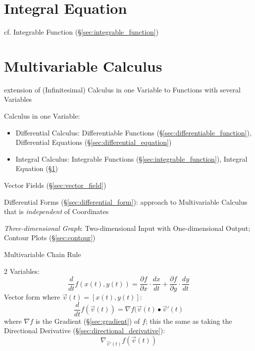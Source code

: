 \section{Integral Equation}\label{sec:integral_equation}

cf. Integrable Function (\S\ref{sec:integrable_function})



\section{Multivariable Calculus}\label{sec:multivariable_calculus}

extension of (Infinitesimal) Calculus in one Variable to Functions with several
Variables

Calculus in one Variable:
\begin{itemize}
\item Differential Calculus: Differentiable Functions
  (\S\ref{sec:differentiable_function}), Differential Equations
  (\S\ref{sec:differential_equation})
\item Integral Calculus: Integrable Functions
  (\S\ref{sec:integrable_function}), Integral Equation
  (\S\ref{sec:integral_equation})
\end{itemize}

\fist Vector Fields (\S\ref{sec:vector_field})

\fist Differential Forms (\S\ref{sec:differential_form}): approach to
Multivariable Calculus that is \emph{independent} of Coordinates

\emph{Three-dimensional Graph}: Two-dimensional Input with One-dimensional
Output; Contour Plots (\S\ref{sec:contour})

Multivariable Chain Rule

2 Variables:
\[
  \frac{d}{dt} f(x(t),y(t)) =
    \frac{\partial{f}}{\partial{x}} \cdot \frac{dx}{dt}
      + \frac{\partial{f}}{\partial{y}} \cdot \frac{dy}{dt}
\]
Vector form where $\vec{v}(t) = [x(t),y(t)]$:
\[
  \frac{d}{dt}f(\vec{v}(t)) = \nabla{f(\vec{v}(t)}\bullet{\vec{v}'(t)}
\]
where $\nabla{f}$ is the Gradient (\S\ref{sec:gradient}) of $f$; this the same
as taking the Directional Derivative (\S\ref{sec:directional_derivative}):
\[
  \nabla_{\vec{v}'(t)}f(\vec{v}(t))
\]



